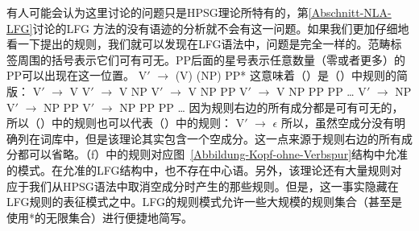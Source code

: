 有人可能会认为这里讨论的问题只是HPSG\indexlfgstartc 理论所特有的，第\ref{Abschnitt-NLA-LFG}讨论的LFG
方法的没有语迹的分析就不会有这一问题。如果我们更加仔细地看一下\citet[]{Dalrymple2006a}提出的规则，我们就可以发现在LFG语法中，问题是完全一样的。范畴标签周围的括号表示它们可有可无。PP后面的星号表示任意数量（零或者更多）的PP可以出现在这一位置。
\ea
V$'$ $\to$ (V) (NP) PP*
\z
这意味着（）是（）中规则的简版：
\eal
\ex V$'$ $\to$ V
\ex V$'$ $\to$ V NP
\ex V$'$ $\to$ V NP PP
\ex V$'$ $\to$ V NP PP PP
\ex \ldots
\ex V$'$ $\to$ NP
\ex V$'$ $\to$ NP PP
\ex V$'$ $\to$ NP PP PP
\ex \ldots
\zl
因为规则右边的所有成分都是可有可无的，所以（）中的规则也可以代表（）中的规则：
\ea
V$'$ $\to$ $\epsilon$
\z
\addlines
所以，虽然空成分没有明确列在词库中，但是该理论其实包含一个空成分。这一点来源于规则右边的所有成分都可以省略。（f）中的规则对应图~\ref{Abbildung-Kopf-ohne-Verbspur}结构中允准的模式。在允准的LFG结构中，也不存在中心语。另外，该理论还有大量规则对应于我们从HPSG语法中取消空成分时产生的那些规则。但是，这一事实隐藏在LFG规则的表征模式之中。LFG的规则模式允许一些大规模的规则集合（甚至是使用*的无限集合）进行便捷地简写\indexlfgendc。

